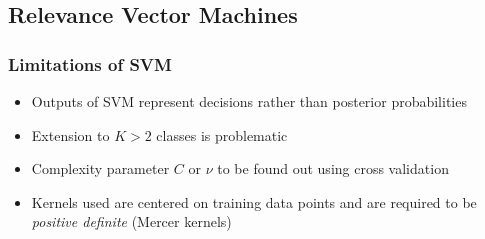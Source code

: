 \documentclass[t,14pt]{beamer}
\begin{document}
\subsection{Relevance Vector Machines}

\begin{frame}
  \frametitle{Limitations of SVM}
  \begin{itemize}
    \item {
            Outputs of SVM represent decisions rather than posterior 
            probabilities
          }
    \item {Extension to $K > 2$ classes is problematic}
    \item {
            Complexity parameter $C$ or $\nu$ to be found out using cross 
            validation
          }
    \item {
            Kernels used are centered on training data points and are required 
            to be \textit{positive definite} (Mercer kernels)
          }
  \end{itemize}
\end{frame}
\end{document}
